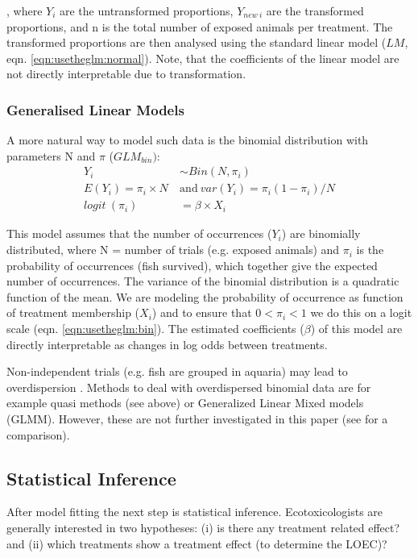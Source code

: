 , where $Y_i$ are the untransformed proportions, $Y_{new~i}$ are the transformed proportions, and n is the total number of exposed animals per treatment.
The transformed proportions are then analysed using the standard linear model ($LM$, eqn. \ref{eqn:usetheglm:normal}).
Note, that the coefficients of the linear model are not directly interpretable due to transformation.


\subsubsection{Generalised Linear Models}
A more natural way to model such data is the  binomial distribution with parameters N and $\pi$ ($GLM_{bin})$:
\begin{align}
  Y_i &\sim Bin(N, \pi_i) \nonumber \\
  E(Y_i) = \pi_i \times N ~&\text{and}~var(Y_i) =  \pi_i (1 - \pi_i) / N \label{eqn:usetheglm:bin} \\
  logit~(\pi_i) &= \beta \times X_i \nonumber
  \end{align}

This model assumes that the number of occurrences ($Y_i$) are binomially distributed, where N = number of trials (e.g. exposed animals) and $\pi_i$ is the probability of occurrences (fish survived), which together give the expected number of occurrences.
The variance of the binomial distribution is a quadratic function of the mean.
We are modeling the probability of occurrence as function of treatment membership ($X_i$) and to ensure that $0 < \pi_i < 1$ we do this on a logit scale (eqn. \ref{eqn:usetheglm:bin}). 
The estimated coefficients ($\beta$) of this model are directly interpretable as changes in log odds between treatments.

Non-independent trials (e.g. fish are grouped in aquaria) may lead to overdispersion \citep{williams_extra-binomial_1982}.
Methods to deal with overdispersed binomial data are for example quasi methods (see above) or Generalized Linear Mixed models (GLMM).
However, these are not further investigated in this paper (see \citet{warton_arcsine_2011} for a comparison).


\subsection{Statistical Inference}
\label{ssec:usetheglm:inference}
After model fitting the next step is statistical inference.
Ecotoxicologists are generally interested in two hypotheses: (i) is there any treatment related effect? and (ii) which treatments show a treatment effect (to determine the LOEC)?

